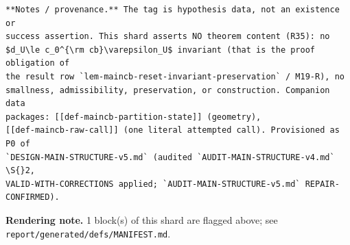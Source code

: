 \begin{defnote}
\begin{verbatim}
**Notes / provenance.** The tag is hypothesis data, not an existence or
success assertion. This shard asserts NO theorem content (R35): no
$d_U\le c_0^{\rm cb}\varepsilon_U$ invariant (that is the proof obligation of
the result row `lem-maincb-reset-invariant-preservation` / M19-R), no
smallness, admissibility, preservation, or construction. Companion data
packages: [[def-maincb-partition-state]] (geometry),
[[def-maincb-raw-call]] (one literal attempted call). Provisioned as P0 of
`DESIGN-MAIN-STRUCTURE-v5.md` (audited `AUDIT-MAIN-STRUCTURE-v4.md` \S{}2,
VALID-WITH-CORRECTIONS applied; `AUDIT-MAIN-STRUCTURE-v5.md` REPAIR-CONFIRMED).
\end{verbatim}
\par
\textbf{Rendering note.} 1 block(s) of this shard are flagged above; see \texttt{report/generated/defs/MANIFEST.md}.
\end{defnote}

